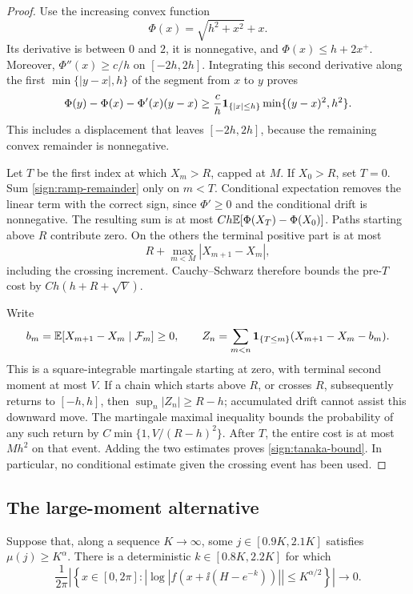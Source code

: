 \begin{proof}
Use the increasing convex function
\[
 \Phi(x)=\sqrt{h^2+x^2}+x.
\]
Its derivative is between \(0\) and \(2\), it is nonnegative, and
\(\Phi(x)\le h+2x^+\).  Moreover,
\(\Phi''(x)\ge c/h\) on \([-2h,2h]\).  Integrating this second derivative
along the first \(\min\{|y-x|,h\}\) of the segment from \(x\) to \(y\)
proves
\begin{equation}\label{sign:ramp-remainder}
 \Phi(y)-\Phi(x)-\Phi'(x)(y-x)
 \ge \frac c h\mathbf 1_{\{|x|\le h\}}\min\{(y-x)^2,h^2\}.
\end{equation}
This includes a displacement that leaves \([-2h,2h]\), because the
remaining convex remainder is nonnegative.

Let \(T\) be the first index at which \(X_m>R\), capped at \(M\).
If \(X_0>R\), set \(T=0\).  Sum \eqref{sign:ramp-remainder} only on
\(m<T\).  Conditional expectation removes the linear term with the correct
sign, since \(\Phi'\ge0\) and the conditional drift is nonnegative.
The resulting sum is at most
\(C h\mathbb E[\Phi(X_T)-\Phi(X_0)]\).  Paths starting above \(R\) contribute
zero.  On the others the terminal positive part is at most
\[
 R+\max_{m<M}|X_{m+1}-X_m|,
\]
including the crossing increment.  Cauchy--Schwarz therefore bounds the
pre-\(T\) cost by \(C h(h+R+\sqrt V)\).

Write
\[
 b_m=\mathbb E[X_{m+1}-X_m\mid\mathcal F_m]\ge0,\qquad
 Z_n=\sum_{m<n}\mathbf 1_{\{T\le m\}}
       (X_{m+1}-X_m-b_m).
\]
This is a square-integrable martingale starting at zero, with terminal
second moment at most \(V\).  If a chain which starts above \(R\), or
crosses \(R\), subsequently returns to \([-h,h]\), then
\(\sup_n|Z_n|\ge R-h\); accumulated drift cannot assist this downward
move.  The martingale maximal inequality bounds the probability of any
such return by \(C\min\{1,V/(R-h)^2\}\).  After \(T\), the entire cost is
at most \(Mh^2\) on that event.  Adding the two estimates proves
\eqref{sign:tanaka-bound}.  In particular, no conditional estimate given
the crossing event has been used.
\end{proof}

\subsection{The large-moment alternative}

\begin{lemma}\label{sign:large-moment}
Suppose that, along a sequence \(K\to\infty\), some
\(j\in[0.9K,2.1K]\) satisfies \(\mu(j)\ge K^\alpha\).  There is a
deterministic \(k\in[0.8K,2.2K]\) for which
\begin{equation}\label{sign:row-small-exception}
 \frac1{2\pi}\left|\left\{x\in[0,2\pi]:
 \left|\log|f(x+\ii(H-e^{-k}))|\right|
           \le K^{\alpha/2}\right\}\right|\longrightarrow0.
\end{equation}
\end{lemma}

